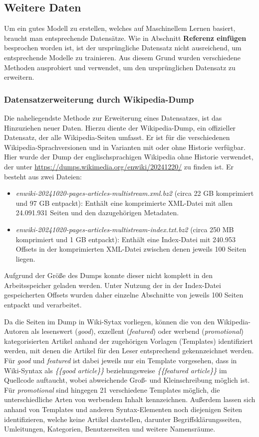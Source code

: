 \subsection{Weitere Daten}
Um ein gutes Modell zu erstellen, welches auf Maschinellem Lernen basiert, braucht man entsprechende Datensätze. Wie in Abschnitt \textbf{Referenz einfügen} besprochen worden ist, ist der ursprüngliche Datensatz nicht ausreichend, um entsprechende Modelle zu trainieren. Aus diesem Grund wurden verschiedene Methoden ausprobiert und verwendet, um den ursprünglichen Datensatz zu erweitern.

\subsubsection{Datensatzerweiterung durch Wikipedia-Dump}
\label{WPDump}
Die naheliegendste Methode zur Erweiterung eines Datensatzes, ist das Hinzuziehen neuer Daten. Hierzu diente der Wikipedia-Dump, ein offizieller Datensatz, der alle Wikipedia-Seiten umfasst. Er ist für die verschiedenen Wikipedia-Sprachversionen und in Varianten mit oder ohne Historie verfügbar. Hier wurde der Dump der englischsprachigen Wikipedia ohne Historie verwendet, der unter \url{https://dumps.wikimedia.org/enwiki/20241220/} zu finden ist. Er besteht aus zwei Dateien:

\begin{itemize}
    \item \emph{enwiki-20241020-pages-articles-multistream.xml.bz2} (circa 22 GB komprimiert und 97 GB entpackt): Enthält eine komprimierte XML-Datei mit allen 24.091.931 Seiten und den dazugehörigen Metadaten.
    \item \emph{enwiki-20241020-pages-articles-multistream-index.txt.bz2} (circa 250 MB komprimiert und 1 GB entpackt): Enthält eine Index-Datei mit 240.953 Offsets in der komprimierten XML-Datei zwischen denen jeweils 100 Seiten liegen.
\end{itemize}

Aufgrund der Größe des Dumps konnte dieser nicht komplett in den Arbeitsspeicher geladen werden. Unter Nutzung der in der Index-Datei gespeicherten Offsets wurden daher einzelne Abschnitte von jeweils 100 Seiten entpackt und verarbeitet.

Da die Seiten im Dump in Wiki-Sytax vorliegen, können die von den Wikipedia-Autoren als lesenswert (\emph{good}), exzellent (\emph{featured}) oder werbend (\emph{promotional}) kategorisierten Artikel anhand der zugehörigen Vorlagen (Templates) identifiziert werden, mit denen die Artikel für den Leser entsprechend gekennzeichnet werden. Für \emph{good} und \emph{featured} ist dabei jeweils nur ein Template vorgesehen, dass in Wiki-Syntax als \textit{\{\{good article\}\}} beziehungsweise \textit{\{\{featured article\}\}} im Quellcode auftaucht, wobei abweichende Groß- und Kleinschreibung möglich ist. Für \emph{promotional} sind hingegen 21 verschiedene Templates möglich, die unterschiedliche Arten von werbendem Inhalt kennzeichnen. Außerdem lassen sich anhand von Templates und anderen Syntax-Elementen noch diejenigen Seiten identifizieren, welche keine Artikel darstellen, darunter Begriffsklärungsseiten, Umleitungen, Kategorien, Benutzerseiten und weitere Namensräume.

